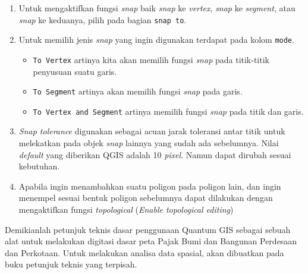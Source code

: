 \begin{enumerate}[1.]
  \item Untuk mengaktifkan fungsi \textit{snap} baik \textit{snap} ke \textit{vertex}, \textit{snap} ke \textit{segment}, atau \textit{snap} ke keduanya, pilih pada bagian \texttt{snap to}.
  
  \item Untuk memilih jenis \textit{snap} yang ingin digunakan terdapat pada kolom \texttt{mode}.
  
  \begin{itemize}
    \item \texttt{To Vertex} artinya kita akan memilih fungsi \textit{snap} pada titik-titik penyusuan suatu garis.
    \item \texttt{To Segment} artinya akan memilih fungsi \textit{snap} pada garis.
    \item \texttt{To Vertex and Segment} artinya memilih fungsi \textit{snap} pada titik dan garis.
  \end{itemize}
  
  \item \textit{Snap tolerance} digunakan sebagai acuan jarak toleransi antar titik untuk melekatkan pada objek \textit{snap} lainnya yang sudah ada sebelumnya. Nilai \textit{default} yang diberikan QGIS adalah 10 \textit{pixel}. Namun dapat dirubah sesuai kebutuhan.
  
  \item Apabila ingin menambahkan suatu poligon pada poligon lain, dan ingin menempel sesuai bentuk poligon sebelumnya dapat dilakukan dengan mengaktifkan fungsi \textit{topological} (\textit{Enable topological editing})
  
\end{enumerate}

Demikianlah petunjuk teknis dasar penggunaan Quantum GIS sebagai sebuah alat untuk melakukan digitasi dasar peta Pajak Bumi dan Bangunan Perdesaan dan Perkotaan. Untuk melakukan analisa data spasial, akan dibuatkan pada buku petunjuk teknis yang terpisah.
